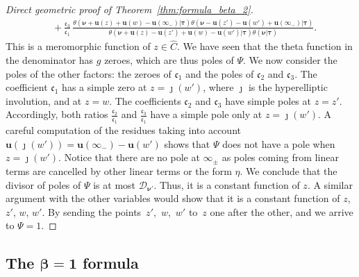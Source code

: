 \documentclass[10pt,a4paper]{amsart}
\numberwithin{equation}{section}
\begin{document}
\begin{proof}[Direct geometric proof of Theorem~\ref{thm:formula_beta_2}]
\begin{align*}
 &{}+ \frac{\mathfrak{c}_{3}}{\mathfrak{c}_1}\,\frac{\theta (\bm{\nu} +\bm{u}(z) + \bm{u}(w) - \bm{u}(\infty_-) |\bm{\tau} )\theta (\bm{\nu}- \bm{u}(z') - \bm{u}(w') + \bm{u}(\infty_-) |\bm{\tau} )}{\theta (\bm{\nu} + \bm{u}(z) - \bm{u}(z') + \bm{u}(w) - \bm{u}(w') |\bm{\tau} )\theta (\bm{\nu} |\bm{\tau} )}.
\end{align*}
This is a meromorphic function of $z \in \widehat{C}$. We have seen that the theta function in the denominator has $g$ zeroes,
which are thus poles of $\Psi$. We now consider the poles of the
 other factors: the zeroes of $\mathfrak{c}_{1}$ and the poles of
 $\mathfrak{c}_{2}$ and $\mathfrak{c}_{3}$. The coefficient $\mathfrak{c}_1$ has a simple zero at $z = \jmath(w')$, where $\jmath$ is the hyperelliptic involution, and at $z = w$. The coefficients $\mathfrak{c}_2$ and $\mathfrak{c}_3$ have simple poles at $z = z'$. Accordingly, both ratios $\frac{\mathfrak{c}_{2}}{\mathfrak{c}_{1}}$ and $\frac{\mathfrak{c}_{3}}{\mathfrak{c}_{1}}$ have a simple pole only at
 $z = \jmath(w')$. A careful computation of the residues taking into account $\bm{u}(\jmath(w')) = \bm{u}(\infty_-) - \bm{u}(w')$ shows that $\Psi$ does not have a pole when $z = \jmath(w')$. Notice that there are no pole at $\infty_{\pm}$ as poles coming from linear terms are cancelled by other linear terms or the form $\eta$.
 We conclude that the divisor of poles of $\Psi$ is at most $\mathcal{D}_{\bm{\nu}'}$. Thus, it is a constant function of $z$. A similar argument with the other variables would show that it is a constant function of $z$, $z'$, $w$, $w'$. By sending the points~$z'$,~$w$,~$w'$ to~$z$ one after the other, and we arrive to $\Psi = 1$.
\end{proof}

\subsection[The beta = 1 formula]{The $\boldsymbol{\beta = 1}$ formula}
\end{document}

